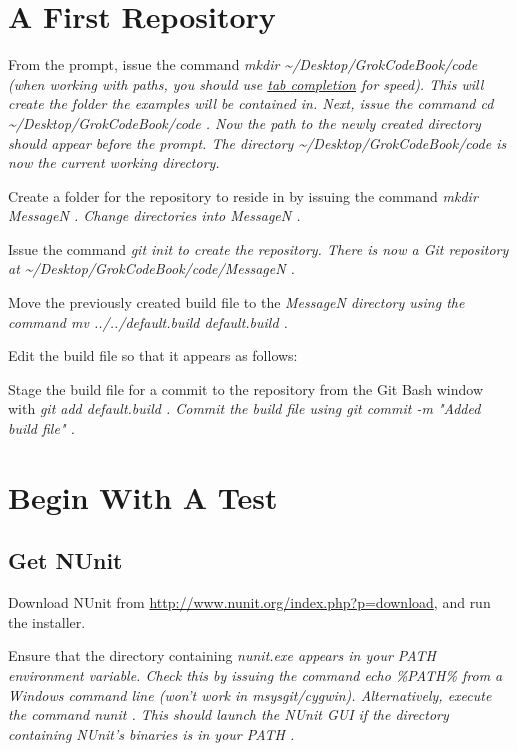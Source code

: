 \section{A First Repository}
From the prompt, issue the command \em mkdir \textasciitilde/Desktop/GrokCodeBook/code \em (when working with paths, you should use \hyperref[tab-completion]{tab completion} for speed). This will create the folder the examples will be contained in. Next, issue the command \em cd \textasciitilde/Desktop/GrokCodeBook/code \em. Now the path to the newly created directory should appear before the prompt. The directory \em \textasciitilde/Desktop/GrokCodeBook/code \em is now the current working directory.

Create a folder for the repository to reside in by issuing the command \em mkdir MessageN \em. Change directories into \em MessageN \em.

Issue the command \em git init \em to create the repository. There is now a Git repository at \em \textasciitilde/Desktop/GrokCodeBook/code/MessageN \em.

Move the previously created build file to the \em MessageN \em directory using the command \em mv ../../default.build default.build \em.

Edit the build file so that it appears as follows:

 

Stage the build file for a commit to the repository from the Git Bash window with \em git add default.build \em. Commit the build file using \em git commit -m "Added build file" \em.

\section{Begin With A Test}

\subsection{Get NUnit}
Download NUnit from \url{http://www.nunit.org/index.php?p=download}, and run the installer.

Ensure that the directory containing \em nunit.exe \em appears in your \em PATH \em environment variable. Check this by issuing the command \em echo \%PATH\% \em from a Windows command line (won't work in msysgit/cygwin). Alternatively, execute the command \em nunit \em. This should launch the NUnit \gls{GUI} if the directory containing NUnit's binaries is in your \em PATH \em.

